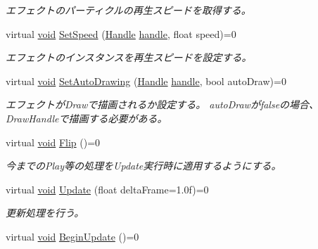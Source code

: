 \begin{DoxyCompactItemize}
\begin{DoxyCompactList}\small\item\em エフェクトのパーティクルの再生スピードを取得する。 \end{DoxyCompactList}\item 
virtual \mbox{\hyperlink{namespace_effekseer_ab34c4088e512200cf4c2716f168deb56}{void}} \mbox{\hyperlink{class_effekseer_1_1_manager_aa85b08562c442cfdce24781158a71431}{Set\+Speed}} (\mbox{\hyperlink{namespace_effekseer_afba58b8d812da862190e9bbfc040824a}{Handle}} \mbox{\hyperlink{namespace_effekseer_afd99b336b206999bdcca3e431648efbc}{handle}}, float speed)=0
\begin{DoxyCompactList}\small\item\em エフェクトのインスタンスを再生スピードを設定する。 \end{DoxyCompactList}\item 
virtual \mbox{\hyperlink{namespace_effekseer_ab34c4088e512200cf4c2716f168deb56}{void}} \mbox{\hyperlink{class_effekseer_1_1_manager_a3829cb7c98f3c41d79394eead1eaaa04}{Set\+Auto\+Drawing}} (\mbox{\hyperlink{namespace_effekseer_afba58b8d812da862190e9bbfc040824a}{Handle}} \mbox{\hyperlink{namespace_effekseer_afd99b336b206999bdcca3e431648efbc}{handle}}, bool auto\+Draw)=0
\begin{DoxyCompactList}\small\item\em エフェクトが\+Drawで描画されるか設定する。 auto\+Drawがfalseの場合、\+Draw\+Handleで描画する必要がある。 \end{DoxyCompactList}\item 
virtual \mbox{\hyperlink{namespace_effekseer_ab34c4088e512200cf4c2716f168deb56}{void}} \mbox{\hyperlink{class_effekseer_1_1_manager_ab810f714df5d12c566664183f365cbf4}{Flip}} ()=0
\begin{DoxyCompactList}\small\item\em 今までの\+Play等の処理を\+Update実行時に適用するようにする。 \end{DoxyCompactList}\item 
virtual \mbox{\hyperlink{namespace_effekseer_ab34c4088e512200cf4c2716f168deb56}{void}} \mbox{\hyperlink{class_effekseer_1_1_manager_ac086ec64cb5f99172e8bf655b77e1464}{Update}} (float delta\+Frame=1.\+0f)=0
\begin{DoxyCompactList}\small\item\em 更新処理を行う。 \end{DoxyCompactList}\item 
virtual \mbox{\hyperlink{namespace_effekseer_ab34c4088e512200cf4c2716f168deb56}{void}} \mbox{\hyperlink{class_effekseer_1_1_manager_a8b9585b3bee11d4d0d7b29b742178f96}{Begin\+Update}} ()=0

\end{DoxyCompactItemize}
